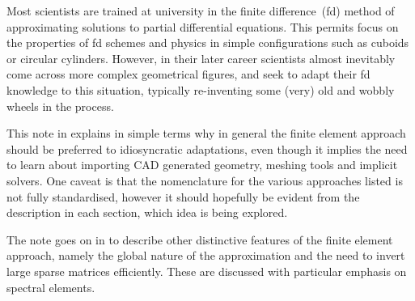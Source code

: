 Most scientists are trained at university in the finite difference~(fd)
method of approximating solutions to partial differential equations.
This permits focus on the properties of fd schemes and physics
in simple configurations such as cuboids or circular cylinders.
However, in their later career scientists almost inevitably come across
more complex geometrical figures, and 
seek to adapt their fd knowledge to this situation,
typically re-inventing some (very) old and wobbly wheels in the process.

This note in  explains in simple terms why in general the finite element
approach should be preferred to idiosyncratic adaptations,
even though it implies the need to
learn about importing CAD generated geometry, meshing tools and implicit solvers.
One caveat is that the nomenclature for the various approaches listed
is not fully standardised, however it should hopefully be evident
from the description in each section, which idea is being explored.

The note goes on in  to describe
other distinctive features of the finite element
approach, namely the global nature of the approximation and the 
need to invert large sparse matrices efficiently.
These are discussed with particular emphasis on
spectral elements.

